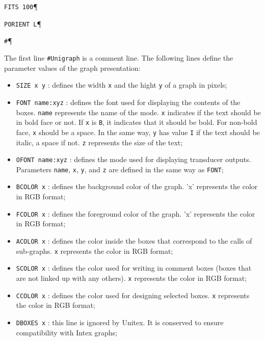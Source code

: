 \verb+FITS 100+\P

\verb+PORIENT L+\P

\verb+#+\P

\bigskip
\noindent The first line \verb+#Unigraph+ is a comment line. The following lines
define the parameter values of the graph presentation:

\begin{itemize}
  \item \verb+SIZE x y+ : defines the width \verb+x+ and the hight \verb+y+ of a graph in pixels;
  
  \item \verb+FONT name:xyz+ : defines the font used for displaying the contents
  of the boxes. \verb+name+ represents the name of the mode. \verb+x+ indicates
  if the text should be in bold face or not. If \verb+x+ is \verb+B+, it
  indicates that it should be bold. For non-bold face, \verb+x+ should be a
  space. In the same way, \verb+y+ has value \verb+I+ if the text should be
  italic, a space if not. \verb+z+ represents the size of the text;

  \item \verb+OFONT name:xyz+ : defines the mode used for displaying transducer
  outputs. Parameters \verb+name+, \verb+x+, \verb+y+, and \verb+z+ are defined
  in the same way as \verb+FONT+;
  
  \item \verb+BCOLOR x+ : defines the background color of the graph. 'x'
  represents the color in RGB format;

  \item \verb+FCOLOR x+ : defines the foreground color of the graph. 'x'
  represents the color in RGB format;

  \item \verb+ACOLOR x+ : defines the color inside the boxes that correspond to
  the calls of sub-graphs. \verb+x+ represents the color in RGB format;

  \item \verb+SCOLOR x+ :  defines the color used for writing in comment boxes
  (boxes that are not linked up with any others). \verb+x+ represents the color
  in RGB format;

  \item \verb+CCOLOR x+ : defines the color used for designing selected boxes.
  \verb+x+ represents the color in RGB format;

  \item \verb+DBOXES x+ : this line is ignored by Unitex. It is conserved to
  ensure compatibility with Intex graphs;


\end{itemize}
